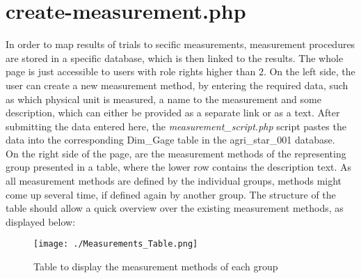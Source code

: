\section{create-measurement.php}
In order to map results of trials to secific measurements, measurement procedures are stored in a specific database, which is then linked to the results. The whole page is just accessible to users with 
role rights higher than 2. On the left side, the user can create a new measurement method, by entering the required data, such as which physical unit is measured, a name to the measurement and some 
description, which can either be provided as a separate link or as a text. After submitting the data entered here, the \emph{measurement\_script.php} script pastes the data into the corresponding 
Dim\_Gage table in the agri\_star\_001 database.\\
On the right side of the page, are the measurement methods of the representing group presented in a table, where the lower row contains the description text. As all measurement methods are defined by 
the individual groups, methods might come up several time, if defined again by another group. The structure of the table should allow a quick overview over the existing measurement methods, as displayed 
below:
\begin{figure}[h!]
 \centering
 \texttt{[image: ./Measurements\_Table.png]}
 \caption{Table to display the measurement methods of each group}
\end{figure}

